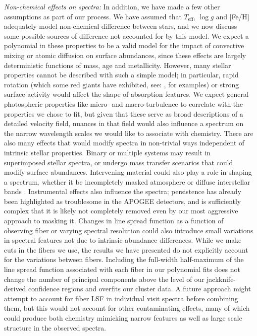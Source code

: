 \documentclass[a4paper,fleqn,usenatbib]{mnras}
\newcommand       \teff     {{T_{\mathrm{eff}}}}
\begin{document}
\textit{Non-chemical effects on spectra:} In addition, we have made a few other assumptions as part of our process. We have assumed that $\teff$, $\log g$ and [Fe/H] adequately model non-chemical difference between stars, and we now discuss some possible sources of difference not accounted for by this model. We expect a polynomial in these properties  to be a valid model for the impact of convective mixing or atomic diffusion on surface abundances, since these effects are largely deterministic functions of mass, age and metallicity. However, many stellar properties cannot be described with such a simple model; in particular, rapid rotation (which some red giants have exhibited, see: \citealt{DeMedeiros1999}, \citealt{Massarotti2008} for examples) or strong surface activity would affect the shape of absorption features. We expect general photospheric properties like micro- and macro-turbulence to correlate with the properties we chose to fit, but given that these serve as broad descriptions of a detailed velocity field, nuances in that field would also influence a spectrum on the narrow wavelength scales we would like to associate with chemistry. There are also many effects that would modify spectra in non-trivial ways independent of intrinsic stellar properties. Binary or multiple systems may result in superimposed stellar spectra, or undergo mass transfer scenarios that could modify surface abundances.  Intervening material could also play a role in shaping a spectrum, whether it be incompletely masked atmosphere or diffuse interstellar bands \citep{Zasowski2014}. Instrumental effects also influence the spectra; persistence has already been highlighted as troublesome in the APOGEE detectors, and is sufficiently complex that it is likely not completely removed even by our most aggressive approach to masking it. Changes in line spread function as a function of observing fiber or varying spectral resolution could also introduce small variations in spectral features not due to intrinsic abundance differences. While we make cuts in the fibers we use, the results we have presented do not explicitly account for the variations between fibers. Including the full-width half-maximum of the line spread function associated with each fiber in our polynomial fits does not change the number of principal components above the level of our jackknife-derived confidence regions and overfits our cluster data. A future approach might attempt to account for fiber LSF in individual visit spectra before combining them, but this would not account for other contaminating effects, many of which could produce both chemistry mimicking narrow features as well as large scale structure in the observed spectra.
\end{document}
